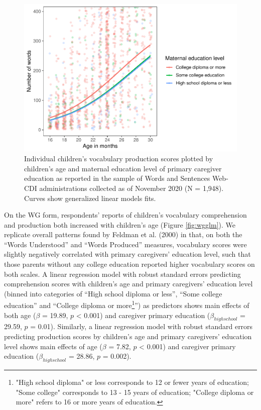 \documentclass[
  english,
  ,man,floatsintext]{apa6}
\begin{document}
\begin{figure}
\centering
\includegraphics{webcdi_paper_files/figure-latex/wsglm-1.pdf}
\caption{\label{fig:wsglm}Individual children's vocabulary production scores plotted by children's age and maternal education level of primary caregiver education as reported in the sample of Words and Sentences Web-CDI administrations collected as of November 2020 (N = 1,948). Curves show generalized linear models fits.}
\end{figure}

On the WG form, respondents' reports of children's vocabulary comprehension and production both increased with children's age (Figure \ref{fig:wgglm}). We replicate overall patterns found by Feldman et al. (2000) in that, on both the \enquote{Words Understood} and \enquote{Words Produced} measures, vocabulary scores were slightly negatively correlated with primary caregivers' education level, such that those parents without any college education reported higher vocabulary scores on both scales. A linear regression model with robust standard errors predicting comprehension scores with children's age and primary caregivers' education level (binned into categories of \enquote{High school diploma or less}, \enquote{Some college education} and \enquote{College diploma or more\footnote{"High school diploma" or less corresponds to 12 or fewer years of education; "Some college" corresponds to 13 - 15 years of education; "College diploma or more" refers to 16 or more years of education.}}) as predictors shows main effects of both age (\(\beta\) = 19.89, \(p\) \textless{} 0.001) and caregiver primary education (\(\beta_{high school}\) = 29.59, \(p\) = 0.01). Similarly, a linear regression model with robust standard errors predicting production scores by children's age and primary caregivers' education level shows main effects of age (\(\beta\) = 7.82, \(p\) \textless{} 0.001) and caregiver primary education (\(\beta_{high school}\) = 28.86, \(p\) = 0.002).
\end{document}
